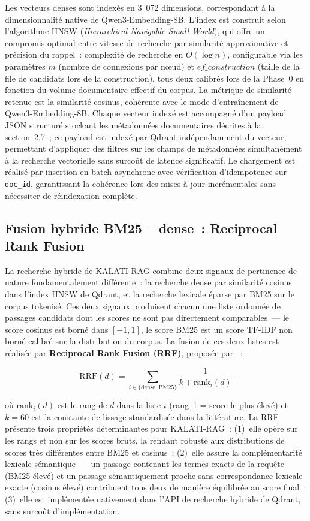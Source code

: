 \documentclass[12pt,a4paper]{report}
\begin{document}
Les vecteurs denses sont indexés en 3~072 dimensions, correspondant à la dimensionnalité native
de Qwen3-Embedding-8B. L'index est construit selon l'algorithme HNSW
(\textit{Hierarchical Navigable Small World}), qui offre un compromis optimal entre vitesse de
recherche par similarité approximative et précision du rappel~: complexité de recherche en
$O(\log n)$, configurable via les paramètres $m$ (nombre de connexions par nœud) et
$ef\_construction$ (taille de la file de candidats lors de la construction), tous deux calibrés
lors de la Phase~0 en fonction du volume documentaire effectif du corpus. La métrique de
similarité retenue est la similarité cosinus, cohérente avec le mode d'entraînement de
Qwen3-Embedding-8B. Chaque vecteur indexé est accompagné d'un payload JSON structuré stockant
les métadonnées documentaires décrites à la section~2.7~; ce payload est indexé par Qdrant
indépendamment du vecteur, permettant d'appliquer des filtres sur les champs de métadonnées
simultanément à la recherche vectorielle sans surcoût de latence significatif. Le chargement
est réalisé par insertion en batch asynchrone avec vérification d'idempotence sur \texttt{doc\_id},
garantissant la cohérence lors des mises à jour incrémentales sans nécessiter de réindexation
complète.

\subsection{Fusion hybride BM25 -- dense~: Reciprocal Rank Fusion}

La recherche hybride de KALATI-RAG combine deux signaux de pertinence de nature fondamentalement
différente~: la recherche dense par similarité cosinus dans l'index HNSW de Qdrant, et la
recherche lexicale éparse par BM25 sur le corpus tokenisé. Ces deux signaux produisent chacun
une liste ordonnée de passages candidats dont les scores ne sont pas directement comparables~---
le score cosinus est borné dans $[-1, 1]$, le score BM25 est un score TF-IDF non borné calibré
sur la distribution du corpus. La fusion de ces deux listes est réalisée par
\textbf{Reciprocal Rank Fusion (RRF)}, proposée par \textcite{Cormack2009}~:

\begin{equation}
\text{RRF}(d) = \sum_{i \in \{\text{dense},\, \text{BM25}\}} \frac{1}{k + \text{rank}_i(d)}
\label{eq:rrf}
\end{equation}

où $\text{rank}_i(d)$ est le rang de $d$ dans la liste $i$ (rang~1 = score le plus élevé) et
$k = 60$ est la constante de lissage standardisée dans la littérature. La RRF présente trois
propriétés déterminantes pour KALATI-RAG~: (1)~elle opère sur les rangs et non sur les scores
bruts, la rendant robuste aux distributions de scores très différentes entre BM25 et cosinus~;
(2)~elle assure la complémentarité lexicale-sémantique~--- un passage contenant les termes exacts
de la requête (BM25 élevé) et un passage sémantiquement proche sans correspondance lexicale exacte
(cosinus élevé) contribuent tous deux de manière équilibrée au score final~; (3)~elle est
implémentée nativement dans l'API de recherche hybride de Qdrant, sans surcoût d'implémentation.
\end{document}
